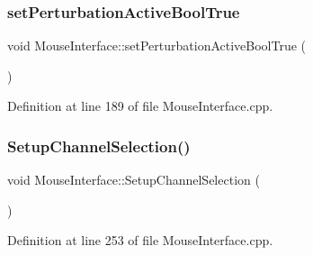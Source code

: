 \subsubsection{\texorpdfstring{set\+Perturbation\+Active\+Bool\+True}{setPerturbationActiveBoolTrue}}
{\footnotesize\ttfamily void Mouse\+Interface\+::set\+Perturbation\+Active\+Bool\+True (\begin{DoxyParamCaption}{ }\end{DoxyParamCaption})\hspace{0.3cm}{\ttfamily [slot]}}



Definition at line 189 of file Mouse\+Interface.\+cpp.

\mbox{\label{class_mouse_interface_a698ae8e0768d1c1cbfc80c0c53ba9dd3}} 
\subsubsection{\texorpdfstring{Setup\+Channel\+Selection()}{SetupChannelSelection()}}
{\footnotesize\ttfamily void Mouse\+Interface\+::\+Setup\+Channel\+Selection (\begin{DoxyParamCaption}{ }\end{DoxyParamCaption})}



Definition at line 253 of file Mouse\+Interface.\+cpp.

